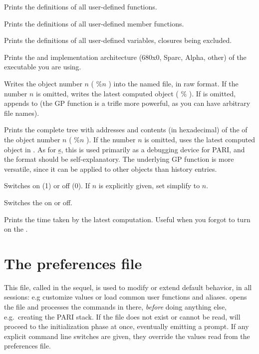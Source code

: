  Prints the definitions of all user-defined functions.

 Prints the definitions of all user-defined member functions.

 Prints the definitions of all user-defined variables,
closures being excluded.

 Prints the  and implementation architecture
(680x0, Sparc, Alpha, other) of the  executable you are using.

 Writes the object number
$n$ ( $\%n$ ) into the named file, in raw format. If the number $n$ is
omitted, writes the latest computed object ( $\%$ ). If  is
omitted, appends to  (the GP function  is a trifle more
powerful, as you can have arbitrary file names).

 Prints the complete tree with addresses and contents
(in hexadecimal) of the  of the object number
$n$ ( $\%n$ ). If the number $n$ is omitted, uses the latest computed object
in . As for \b{s}, this is used primarily as a debugging device for
PARI, and the format should be self-explanatory. The underlying GP
function  is more versatile, since it can be applied to other
objects than history entries.

 Switches  on (1) or off (0). If $n$
is explicitly given, set simplify to $n$.

\subseckbd{\#} Switches the  on or off.

\subseckbd{\#\#} Prints the time taken by the latest computation.
Useful when you forgot to turn on the .

\section{The preferences file}
\label{se:gprc}

This file, called  in the sequel, is used to modify or extend
 default behavior, in all  sessions: e.g customize
 values or load common user functions and aliases. 
opens the  file and processes the commands in there, \emph{before}
doing anything else, e.g.~creating the PARI stack. If the file does not exist
or cannot be read,  will proceed to the initialization phase at once,
eventually emitting a prompt. If any explicit command line switches are
given, they override the values read from the preferences file.

